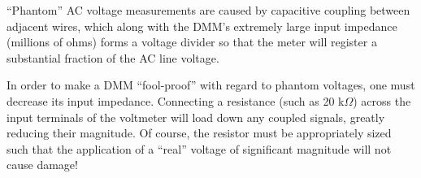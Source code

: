 ``Phantom'' AC voltage measurements are caused by capacitive coupling between adjacent wires, which along with the DMM's extremely large input impedance (millions of ohms) forms a voltage divider so that the meter will register a substantial fraction of the AC line voltage.







In order to make a DMM ``fool-proof'' with regard to phantom voltages, one must decrease its input impedance.  Connecting a resistance (such as 20 k$\Omega$) across the input terminals of the voltmeter will load down any coupled signals, greatly reducing their magnitude.  Of course, the resistor must be appropriately sized such that the application of a ``real'' voltage of significant magnitude will not cause damage!




